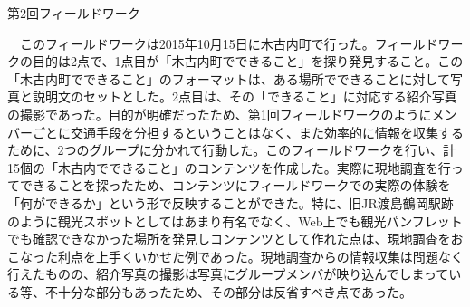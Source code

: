 \begin{description}
\item[第2回フィールドワーク]\mbox{}
\end{description}
　このフィールドワークは2015年10月15日に木古内町で行った。フィールドワークの目的は2点で、1点目が「木古内町でできること」を探り発見すること。この「木古内町でできること」のフォーマットは、ある場所でできることに対して写真と説明文のセットとした。2点目は、その「できること」に対応する紹介写真の撮影であった。目的が明確だったため、第1回フィールドワークのようにメンバーごとに交通手段を分担するということはなく、また効率的に情報を収集するために、2つのグループに分かれて行動した。このフィールドワークを行い、計15個の「木古内でできること」のコンテンツを作成した。実際に現地調査を行ってできることを探ったため、コンテンツにフィールドワークでの実際の体験を「何ができるか」という形で反映することができた。特に、旧JR渡島鶴岡駅跡のように観光スポットとしてはあまり有名でなく、Web上でも観光パンフレットでも確認できなかった場所を発見しコンテンツとして作れた点は、現地調査をおこなった利点を上手くいかせた例であった。現地調査からの情報収集は問題なく行えたものの、紹介写真の撮影は写真にグループメンバが映り込んでしまっている等、不十分な部分もあったため、その部分は反省すべき点であった。

